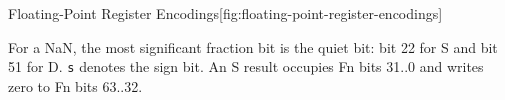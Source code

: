 \begin{BedrockListedFormatDiagram}{Floating-Point Register Encodings}[fig:floating-point-register-encodings]
\end{BedrockListedFormatDiagram}
{\small
For a NaN, the most significant fraction bit is the quiet bit: bit 22 for S and bit 51 for D.
\texttt{s} denotes the sign bit. An S result occupies Fn bits 31..0 and writes zero to Fn bits 63..32.
\par}
